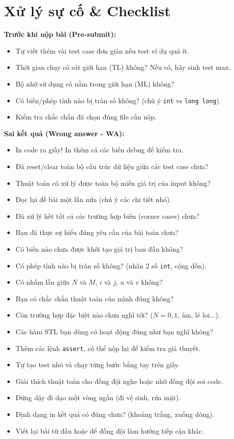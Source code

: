 \section{Xử lý sự cố \& Checklist}
\raggedright
\scriptsize

\textbf{Trước khi nộp bài (Pre-submit):}
\begin{itemize}[noitemsep,topsep=0pt,leftmargin=1.2em]
	\item Tự viết thêm vài test case đơn giản nếu test ví dụ quá ít.
	\item Thời gian chạy có sát giới hạn (TL) không? Nếu có, hãy sinh test max.
	\item Bộ nhớ sử dụng có nằm trong giới hạn (ML) không?
	\item Có biến/phép tính nào bị tràn số không? (chú ý \texttt{int} vs \texttt{long long}).
	\item Kiểm tra chắc chắn đã chọn đúng file cần nộp.
\end{itemize}

\textbf{Sai kết quả (Wrong answer - WA):}
\begin{itemize}[noitemsep,topsep=0pt,leftmargin=1.2em]
	\item In code ra giấy! In thêm cả các biến debug để kiểm tra.
	\item Đã reset/clear toàn bộ cấu trúc dữ liệu giữa các test case chưa?
	\item Thuật toán có xử lý được toàn bộ miền giá trị của input không?
	\item Đọc lại đề bài một lần nữa (chú ý các chi tiết nhỏ).
	\item Đã xử lý hết tất cả các trường hợp biên (corner cases) chưa?
	\item Bạn đã thực sự hiểu đúng yêu cầu của bài toán chưa?
	\item Có biến nào chưa được khởi tạo giá trị ban đầu không?
	\item Có phép tính nào bị tràn số không? (nhân 2 số \texttt{int}, cộng dồn).
	\item Có nhầm lẫn giữa $N$ và $M$, $i$ và $j$, $u$ và $v$ không?
	\item Bạn có chắc chắn thuật toán của mình đúng không?
	\item Còn trường hợp đặc biệt nào chưa nghĩ tới? ($N=0, 1$, âm, lẻ loi...).
	\item Các hàm STL bạn dùng có hoạt động đúng như bạn nghĩ không?
	\item Thêm các lệnh \texttt{assert}, có thể nộp lại để kiểm tra giả thuyết.
	\item Tự tạo test nhỏ và chạy từng bước bằng tay trên giấy.
	\item Giải thích thuật toán cho đồng đội nghe hoặc nhờ đồng đội soi code.
	\item Đứng dậy đi dạo một vòng ngắn (đi vệ sinh, rửa mặt).
	\item Định dạng in kết quả có đúng chưa? (khoảng trắng, xuống dòng).
	\item Viết lại bài từ đầu hoặc để đồng đội làm hướng tiếp cận khác.
\end{itemize}


